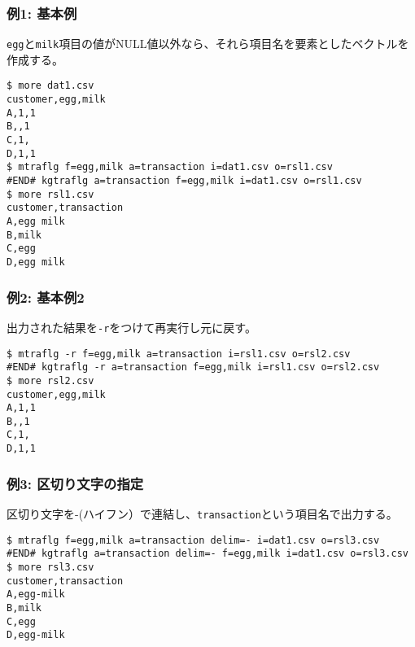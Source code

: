 \subsubsection*{例1: 基本例}

\verb|egg|と\verb|milk|項目の値がNULL値以外なら、それら項目名を要素としたベクトルを作成する。


\begin{Verbatim}[baselinestretch=0.7,frame=single]
$ more dat1.csv
customer,egg,milk
A,1,1
B,,1
C,1,
D,1,1
$ mtraflg f=egg,milk a=transaction i=dat1.csv o=rsl1.csv
#END# kgtraflg a=transaction f=egg,milk i=dat1.csv o=rsl1.csv
$ more rsl1.csv
customer,transaction
A,egg milk
B,milk
C,egg
D,egg milk
\end{Verbatim}
\subsubsection*{例2: 基本例2}

出力された結果を\verb|-r|をつけて再実行し元に戻す。


\begin{Verbatim}[baselinestretch=0.7,frame=single]
$ mtraflg -r f=egg,milk a=transaction i=rsl1.csv o=rsl2.csv
#END# kgtraflg -r a=transaction f=egg,milk i=rsl1.csv o=rsl2.csv
$ more rsl2.csv
customer,egg,milk
A,1,1
B,,1
C,1,
D,1,1
\end{Verbatim}
\subsubsection*{例3: 区切り文字の指定}

区切り文字を-(ハイフン）で連結し、\verb|transaction|という項目名で出力する。


\begin{Verbatim}[baselinestretch=0.7,frame=single]
$ mtraflg f=egg,milk a=transaction delim=- i=dat1.csv o=rsl3.csv
#END# kgtraflg a=transaction delim=- f=egg,milk i=dat1.csv o=rsl3.csv
$ more rsl3.csv
customer,transaction
A,egg-milk
B,milk
C,egg
D,egg-milk
\end{Verbatim}
